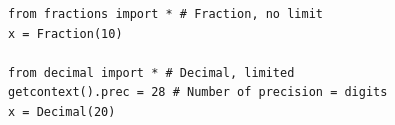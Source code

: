 \begin{verbatim}
from fractions import * # Fraction, no limit
x = Fraction(10)

from decimal import * # Decimal, limited
getcontext().prec = 28 # Number of precision = digits
x = Decimal(20)
\end{verbatim}